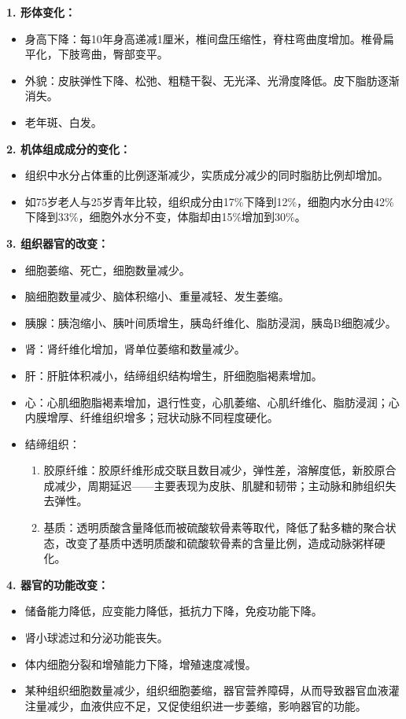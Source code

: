 \begin{defbox}
\textbf{1. 形体变化：}
\begin{itemize}[leftmargin=*]
    \item 身高下降：每10年身高递减1厘米，椎间盘压缩性，脊柱弯曲度增加。椎骨扁平化，下肢弯曲，臀部变平。
    \item 外貌：皮肤弹性下降、松弛、粗糙干裂、无光泽、光滑度降低。皮下脂肪逐渐消失。
    \item 老年斑、白发。
\end{itemize}

\textbf{2. 机体组成成分的变化：}
\begin{itemize}[leftmargin=*]
    \item 组织中水分占体重的比例逐渐减少，实质成分减少的同时脂肪比例却增加。
    \item 如75岁老人与25岁青年比较，组织成分由17\%下降到12\%，细胞内水分由42\%下降到33\%，细胞外水分不变，体脂却由15\%增加到30\%。
\end{itemize}

\textbf{3. 组织器官的改变：}
\begin{itemize}[leftmargin=*]
    \item 细胞萎缩、死亡，细胞数量减少。
    \item 脑细胞数量减少、脑体积缩小、重量减轻、发生萎缩。
    \item 胰腺：胰泡缩小、胰叶间质增生，胰岛纤维化、脂肪浸润，胰岛B细胞减少。
    \item 肾：肾纤维化增加，肾单位萎缩和数量减少。
    \item 肝：肝脏体积减小，结缔组织结构增生，肝细胞脂褐素增加。
    \item 心：心肌细胞脂褐素增加，退行性变，心肌萎缩、心肌纤维化、脂肪浸润；心内膜增厚、纤维组织增多；冠状动脉不同程度硬化。
    \item 结缔组织：
    \begin{enumerate}
        \item 胶原纤维：胶原纤维形成交联且数目减少，弹性差，溶解度低，新胶原合成减少，周期延迟——主要表现为皮肤、肌腱和韧带；主动脉和肺组织失去弹性。
        \item 基质：透明质酸含量降低而被硫酸软骨素等取代，降低了黏多糖的聚合状态，改变了基质中透明质酸和硫酸软骨素的含量比例，造成动脉粥样硬化。
    \end{enumerate}
\end{itemize}

\textbf{4. 器官的功能改变：}
\begin{itemize}[leftmargin=*]
    \item 储备能力降低，应变能力降低，抵抗力下降，免疫功能下降。
    \item 肾小球滤过和分泌功能丧失。
    \item 体内细胞分裂和增殖能力下降，增殖速度减慢。
    \item 某种组织细胞数量减少，组织细胞萎缩，器官营养障碍，从而导致器官血液灌注量减少，血液供应不足，又促使组织进一步萎缩，影响器官的功能。
\end{itemize}


\end{defbox}
